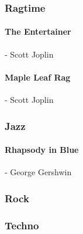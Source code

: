 			\subsubsection{Ragtime}
				\paragraph{The Entertainer} - Scott Joplin
				\paragraph{Maple Leaf Rag} - Scott Joplin
				
			\subsubsection{Jazz}
				\paragraph{Rhapsody in Blue} - George Gershwin
			
			\subsubsection{Rock}
			
			\subsubsection{Techno}
				
			